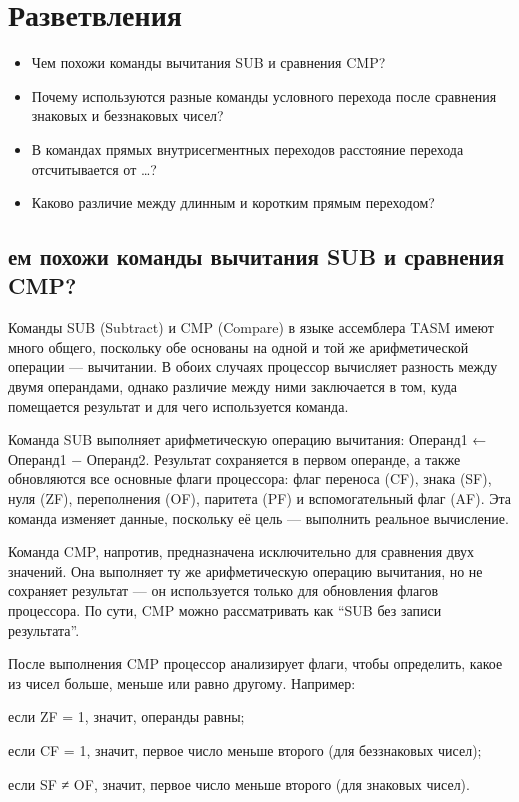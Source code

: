 \chapter{Разветвления}
\begin{itemize}
\item Чем похожи команды вычитания SUB и сравнения CMP?
\item Почему используются разные команды условного перехода после сравнения знаковых и беззнаковых чисел?
\item В командах прямых внутрисегментных переходов расстояние перехода отсчитывается от \dots ?
\item Каково различие между длинным и коротким прямым переходом?
\end{itemize}

\section{ем похожи команды вычитания SUB и сравнения CMP?}

Команды SUB (Subtract) и CMP (Compare) в языке ассемблера TASM имеют много общего, поскольку обе основаны на одной и той же арифметической операции — вычитании. В обоих случаях процессор вычисляет разность между двумя операндами, однако различие между ними заключается в том, куда помещается результат и для чего используется команда.

Команда SUB выполняет арифметическую операцию вычитания:
Операнд1 ← Операнд1 − Операнд2.
Результат сохраняется в первом операнде, а также обновляются все основные флаги процессора: флаг переноса (CF), знака (SF), нуля (ZF), переполнения (OF), паритета (PF) и вспомогательный флаг (AF). Эта команда изменяет данные, поскольку её цель — выполнить реальное вычисление.

Команда CMP, напротив, предназначена исключительно для сравнения двух значений. Она выполняет ту же арифметическую операцию вычитания, но не сохраняет результат — он используется только для обновления флагов процессора. По сути, CMP можно рассматривать как “SUB без записи результата”.

После выполнения CMP процессор анализирует флаги, чтобы определить, какое из чисел больше, меньше или равно другому. Например:

если ZF = 1, значит, операнды равны;

если CF = 1, значит, первое число меньше второго (для беззнаковых чисел);

если SF ≠ OF, значит, первое число меньше второго (для знаковых чисел).

